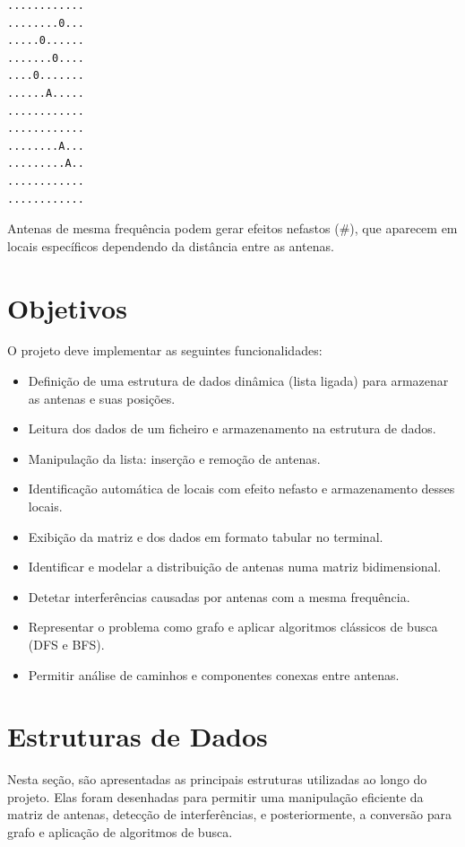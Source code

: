 \documentclass[a4paper,12pt]{article}
\begin{document}
\begin{verbatim}
............
........0...
.....0......
.......0....
....0.......
......A.....
............
............
........A...
.........A..
............
............
\end{verbatim}

Antenas de mesma frequência podem gerar efeitos nefastos (\#), que aparecem em locais específicos dependendo da distância entre as antenas.

\newpage

\section{Objetivos}
O projeto deve implementar as seguintes funcionalidades:
\begin{itemize}
    \item Definição de uma estrutura de dados dinâmica (lista ligada) para armazenar as antenas e suas posições.
    \item Leitura dos dados de um ficheiro e armazenamento na estrutura de dados.
    \item Manipulação da lista: inserção e remoção de antenas.
    \item Identificação automática de locais com efeito nefasto e armazenamento desses locais.
    \item Exibição da matriz e dos dados em formato tabular no terminal.
    \item Identificar e modelar a distribuição de antenas numa matriz bidimensional.
    \item Detetar interferências causadas por antenas com a mesma frequência.
    \item Representar o problema como grafo e aplicar algoritmos clássicos de busca (DFS e BFS).
    \item Permitir análise de caminhos e componentes conexas entre antenas.
\end{itemize}

\newpage

\section{Estruturas de Dados}
Nesta seção, são apresentadas as principais estruturas utilizadas ao longo do projeto. Elas foram desenhadas para permitir uma manipulação eficiente da matriz de antenas, detecção de interferências, e posteriormente, a conversão para grafo e aplicação de algoritmos de busca.
\end{document}
